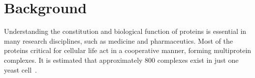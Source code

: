 \documentclass{bmcart}
\begin{document}
\begin{frontmatter}
\begin{abstractbox}

\begin{keyword}
\end{keyword}


\end{abstractbox}
%

\end{frontmatter}



\section*{Background}
Understanding the constitution and biological function of proteins is essential in many research disciplines, such as medicine and pharmaceutics.
Most of the proteins critical for cellular life act in a cooperative manner, forming multiprotein complexes. 
It is estimated that approximately 800 complexes exist in just one yeast cell~\cite{Gavin}. 
\end{document}
